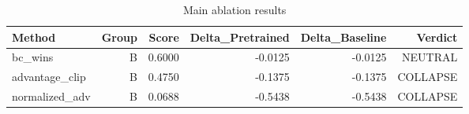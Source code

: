 \begin{table}[htbp]
\centering
\caption{Main ablation results}
\label{tab:main-results}
\begin{tabular}{lrrrrr}
\toprule
\textbf{Method} & \textbf{Group} & \textbf{Score} & \textbf{Delta\_Pretrained} & \textbf{Delta\_Baseline} & \textbf{Verdict} \\
\midrule
bc\_wins & B & 0.6000 & -0.0125 & -0.0125 & NEUTRAL \\
advantage\_clip & B & 0.4750 & -0.1375 & -0.1375 & COLLAPSE \\
normalized\_adv & B & 0.0688 & -0.5438 & -0.5438 & COLLAPSE \\
\bottomrule
\end{tabular}
\end{table}
